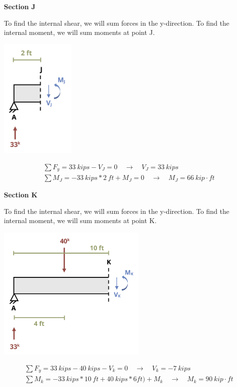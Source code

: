 \documentclass[
  letterpaper,
  DIV=11,
  numbers=noendperiod]{scrreprt}
\begin{document}
\begin{tcolorbox}
\begin{tcolorbox}
\textbf{Section J}

To find the internal shear, we will sum forces in the y-direction. To
find the internal moment, we will sum moments at point J.

\begin{center}
\includegraphics[width=1.44792in,height=\textheight]{images/CH7 PNGs/example 7.1 part 3.png}
\end{center}

\[
\begin{aligned}
&\sum F_y=33{~kips}-V_J=0 \quad\rightarrow\quad V_J=33{~kips} \\
&\sum  M_J=-33{~kips}*2{~ft}+M_J=0 \quad\rightarrow\quad M_J=66{~kip}\cdot{ft}
\end{aligned}
\]

\textbf{Section K}

To find the internal shear, we will sum forces in the y-direction. To
find the internal moment, we will sum moments at point K.

\begin{center}
\includegraphics[width=2.88542in,height=\textheight]{images/CH7 PNGs/example 7.1 part 4.png}
\end{center}

\[
\begin{aligned}
&\sum F_y=33{~kips}-40{~kips}-V_k=0 \quad\rightarrow\quad V_k=-7{~kips} \\
&\sum M_k=-33{~kips}*10{~ft}+40{~kips}*6{ft})+M_k \quad\rightarrow\quad M_k=90{~kip}\cdot{ft}
\end{aligned}
\]


\end{tcolorbox}
\end{tcolorbox}
\end{document}
